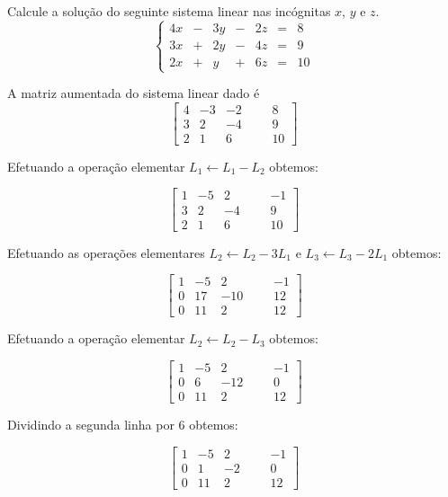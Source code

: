 \begin{problem}
Calcule a solução do seguinte sistema linear nas incógnitas $x$, $y$ e $z$.
$$\left\{\begin{array}{rrrrrrr}
 4x & - & 3y & - & 2z & = &   8 \\
 3x & + & 2y & - & 4z & = &   9 \\
 2x & + &  y & + & 6z & = &  10 \end{array}\right. $$
\end{problem}
\begin{solution}
A matriz aumentada do sistema linear dado é
$$ \left[\begin{array}{rrrr|rr}
	4 &  -3 &   -2 & & &   8  \\
	3 &   2 &   -4 & & &   9  \\ 
	2 &   1 &    6 & & &  10  \end{array}\right] $$

Efetuando a operação elementar $L_1 \leftarrow L_1 - L_2$ obtemos:

$$ \left[\begin{array}{rrrr|rr}
	1 &  -5 &    2 & & &  -1  \\
	3 &   2 &   -4 & & &   9  \\ 
	2 &   1 &    6 & & &  10  \end{array}\right] $$

Efetuando as operações elementares $L_2 \leftarrow L_2 - 3L_1$ e $L_3 \leftarrow L_3 - 2L_1$ obtemos:

$$ \left[\begin{array}{rrrr|rr}
	1 &  -5 &    2 & & &  -1  \\
	0 &  17 &  -10 & & &  12  \\ 
	0 &  11 &    2 & & &  12  \end{array}\right] $$

Efetuando a operação elementar $L_2 \leftarrow L_2 - L_3$ obtemos:

$$ \left[\begin{array}{rrrr|rr}
	1 &  -5 &    2 & & &  -1  \\
	0 &   6 &  -12 & & &   0  \\ 
	0 &  11 &    2 & & &  12  \end{array}\right] $$

Dividindo a segunda linha por 6 obtemos:

$$ \left[\begin{array}{rrrr|rr}
	1 &  -5 &    2 & & &  -1  \\
	0 &   1 &   -2 & & &   0  \\ 
	0 &  11 &    2 & & &  12  \end{array}\right] $$


\end{solution}
